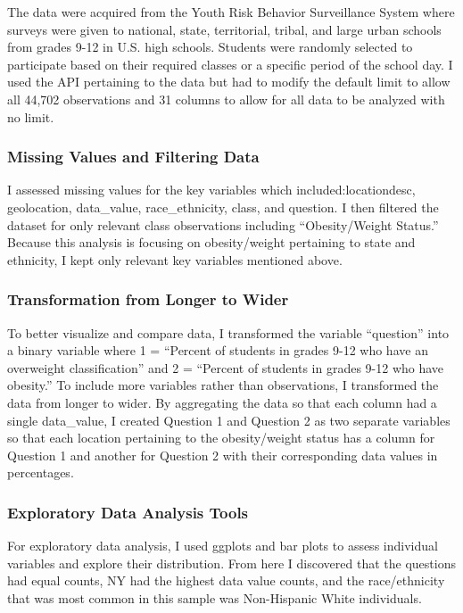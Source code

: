 \documentclass[
  letterpaper,
  DIV=11,
  numbers=noendperiod]{scrartcl}
\begin{document}
The data were acquired from the Youth Risk Behavior Surveillance System
where surveys were given to national, state, territorial, tribal, and
large urban schools from grades 9-12 in U.S. high schools. Students were
randomly selected to participate based on their required classes or a
specific period of the school day. I used the API pertaining to the data
but had to modify the default limit to allow all 44,702 observations and
31 columns to allow for all data to be analyzed with no limit.

\subsubsection{Missing Values and Filtering
Data}\label{missing-values-and-filtering-data}

I assessed missing values for the key variables which
included:locationdesc, geolocation, data\_value, race\_ethnicity, class,
and question. I then filtered the dataset for only relevant class
observations including ``Obesity/Weight Status.'' Because this analysis
is focusing on obesity/weight pertaining to state and ethnicity, I kept
only relevant key variables mentioned above.

\subsubsection{Transformation from Longer to
Wider}\label{transformation-from-longer-to-wider}

To better visualize and compare data, I transformed the variable
``question'' into a binary variable where 1 = ``Percent of students in
grades 9-12 who have an overweight classification'' and 2 = ``Percent of
students in grades 9-12 who have obesity.'' To include more variables
rather than observations, I transformed the data from longer to wider.
By aggregating the data so that each column had a single data\_value, I
created Question 1 and Question 2 as two separate variables so that each
location pertaining to the obesity/weight status has a column for
Question 1 and another for Question 2 with their corresponding data
values in percentages.

\subsubsection{Exploratory Data Analysis
Tools}\label{exploratory-data-analysis-tools}

For exploratory data analysis, I used ggplots and bar plots to assess
individual variables and explore their distribution. From here I
discovered that the questions had equal counts, NY had the highest data
value counts, and the race/ethnicity that was most common in this sample
was Non-Hispanic White individuals.
\end{document}
